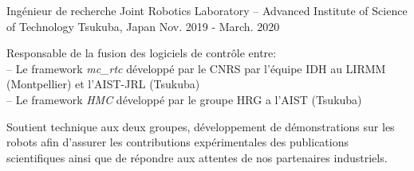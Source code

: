 
\begin{cventries}

  \cventry
    {Ingénieur de recherche} %
    {Joint Robotics Laboratory -- Advanced Institute of Science of Technology} %
    {Tsukuba, Japan} %
    {Nov. 2019 - March. 2020} %
    {
      \begin{cvitems} %
        \item Responsable de la fusion des logiciels de contrôle entre:\\
          -- Le framework \emph{mc\_rtc} développé par le CNRS par l'équipe IDH au LIRMM (Montpellier) et l'AIST-JRL (Tsukuba)\\
          -- Le framework \emph{HMC} développé par le groupe HRG a l'AIST (Tsukuba)
        \item Soutient technique aux deux groupes, développement de démonstrations sur les robots afin d'assurer les contributions expérimentales des publications scientifiques ainsi que de répondre aux attentes de nos partenaires industriels.
      \end{cvitems}
    }


\end{cventries}
